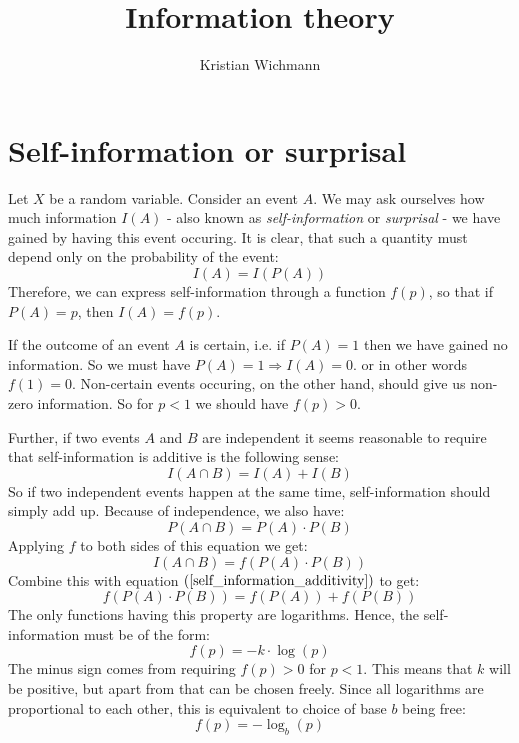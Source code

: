 \documentclass[12pt, a4paper]{article}
\title{Information theory}
\author{Kristian Wichmann}
\numberwithin{equation}{section}
\begin{document}
\maketitle

\section{Self-information or surprisal}
Let $X$ be a random variable. Consider an event $A$. We may ask ourselves how much information $I(A)$ - also known as \textit{self-information} or \textit{surprisal} - we have gained by having this event occuring. It is clear, that such a quantity must depend only on the probability of the event:
\begin{equation}
I(A)=I(P(A))
\end{equation}
Therefore, we can express self-information through a function $f(p)$, so that if $P(A)=p$, then $I(A)=f(p)$.

If the outcome of an event $A$ is certain, i.e. if $P(A)=1$ then we have gained no information. So we must have $P(A)=1\Rightarrow I(A)=0$. or in other words $f(1)=0$. Non-certain events occuring, on the other hand, should give us non-zero information. So for $p<1$ we should have $f(p)>0$.

Further, if two events $A$ and $B$ are independent it seems reasonable to require that self-information is additive is the following sense:
\begin{equation}
\label{self_information_additivity}
I(A\cap B)=I(A)+I(B)
\end{equation}
So if two independent events happen at the same time, self-information should simply add up. Because of independence, we also have:
\begin{equation}
P(A\cap B)=P(A)\cdot P(B)
\end{equation}
Applying $f$ to both sides of this equation we get:
\begin{equation}
I(A\cap B)=f(P(A)\cdot P(B))
\end{equation}
Combine this with equation $(\ref{self_information_additivity})$ to get:
\begin{equation}
f(P(A)\cdot P(B))=f(P(A))+f(P(B))
\end{equation}
The only functions having this property are logarithms. Hence, the self-information must be of the form:
\begin{equation}
f(p)=-k\cdot\log(p)
\end{equation}
The minus sign comes from requiring $f(p)>0$ for $p<1$. This means that $k$ will be positive, but apart from that can be chosen freely. Since all logarithms are proportional to each other, this is equivalent to choice of base $b$ being free:
\begin{equation}
f(p)=-\log_b(p)
\end{equation}
\end{document}
